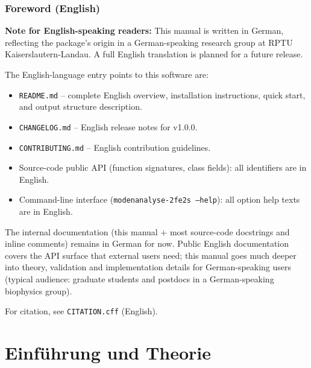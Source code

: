 \documentclass[11pt,a4paper,twoside]{article}
\theoremstyle{remark}
\begin{document}
\tableofcontents
\clearpage

\section*{Foreword (English)}

\textbf{Note for English-speaking readers:} This manual is written in
German, reflecting the package's origin in a German-speaking research
group at RPTU Kaiserslautern-Landau. A full English translation is
planned for a future release.

The English-language entry points to this software are:

\begin{itemize}
  \item \texttt{README.md} -- complete English overview, installation
        instructions, quick start, and output structure description.
  \item \texttt{CHANGELOG.md} -- English release notes for v1.0.0.
  \item \texttt{CONTRIBUTING.md} -- English contribution guidelines.
  \item Source-code public API (function signatures, class fields):
        all identifiers are in English.
  \item Command-line interface (\texttt{modenanalyse-2fe2s --help}):
        all option help texts are in English.
\end{itemize}

The internal documentation (this manual + most source-code docstrings
and inline comments) remains in German for now. Public English
documentation covers the API surface that external users need; this
manual goes much deeper into theory, validation and implementation
details for German-speaking users (typical audience: graduate students
and postdocs in a German-speaking biophysics group).

For citation, see \texttt{CITATION.cff} (English).

\clearpage

\part{Einf\"uhrung und Theorie}
\end{document}
